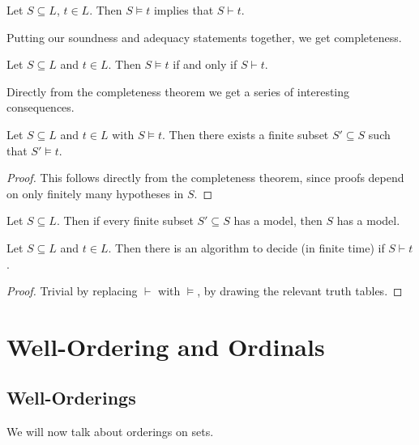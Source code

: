 \documentclass[a4paper, 10pt, twocolumn]{amsart}
\begin{document}
\begin{corollary}[Adequacy]
  Let $S \subseteq L$, $t \in L$. Then $S \models t$ implies that $S \vdash t$. 
\end{corollary}

Putting our soundness and adequacy statements together, we get completeness.

\begin{theorem}
  Let $S \subseteq L$ and $t \in L$. Then $S \models t$ if and only if $S \vdash t$.
\end{theorem}

Directly from the completeness theorem we get a series of interesting consequences.

\begin{theorem}
  Let $S \subseteq L$ and $t \in L$ with $S \models t$. Then there exists a finite subset $S' \subseteq S$ such that $S' \models t$.
\end{theorem}
\begin{proof}
  This follows directly from the completeness theorem, since proofs depend on only finitely many hypotheses in $S$.
\end{proof}

\begin{corollary}
  Let $S \subseteq L$. Then if every finite subset $S' \subseteq S$ has a model, then $S$ has a model. 
\end{corollary}

\begin{theorem}[Decidability]
  Let $S \subseteq L$ and $t \in L$. Then there is an algorithm to decide (in finite time) if $S \vdash t$.
\end{theorem}
\begin{proof}
  Trivial by replacing $\vdash$ with $\models$, by drawing the relevant truth tables.
\end{proof}


\section{Well-Ordering and Ordinals}

\subsection{Well-Orderings}

We will now talk about orderings on sets.
\end{document}
